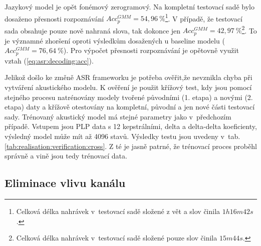 Jazykový model je opět fonémový zerogramový.
Na kompletní testovací sadě bylo dosaženo přesnosti rozpoznávání $Acc_{p}^{GMM} = 54,96\ \%$\footnote{Celková délka nahrávek v~testovací sadě složené z vět a slov činila $1h16m42s$.}.
V případě, že testovací sada obsahuje pouze nově nahraná slova, tak dokonce jen $Acc_{p}^{GMM} = 42,97\ \%$\footnote{Celková délka nahrávek v~testovací sadě složené pouze slov činila $15m44s$.}.
To je významné zhoršení oproti výsledkům dosažených u baseline modelu ($Acc_{p}^{GMM} = 76,64\ \%$).
Pro výpočet přesnosti rozpoznávání je opětovně využit vztah (\ref{eq:asr:decoding:acc}).

Jelikož došlo ke změně ASR frameworku je potřeba ověřit,že nevznikla chyba při vytváření akustického modelu.
K ověření je použit křížový test, kdy jsou pomocí stejného procesu natrénovány modely tvořené původními (1. etapa) a novými (2. etapa) daty a křížově otestovány na kompletní, původní a jen nové části testovací sady.
Trénovaný akustický model má stejné parametry jako v~předchozím případě.
Vstupem jsou PLP data s 12 kepstrálními, delta a delta-delta koeficienty, výsledný model může mít až 4096 stavů.
Výsledky testu jsou uvedeny v~tab. \ref{tab:realisation:verification:cross}.
Z té je jasně patrné, že trénovací proces proběhl správně a vině jsou tedy trénovací data.


\begin{table}[htpb]
  \centering
  \def\arraystretch{1.5}
  \caption[Křížový test s CMN.]{Křížový test modelů natrénovaných a otestovaných na datech z 1. a 2. etapy.}
  \label{tab:realisation:verification:cross}
\end{table}


\subsection{Eliminace vlivu kanálu}
\label{chap:realisation:corpus:elimination}

